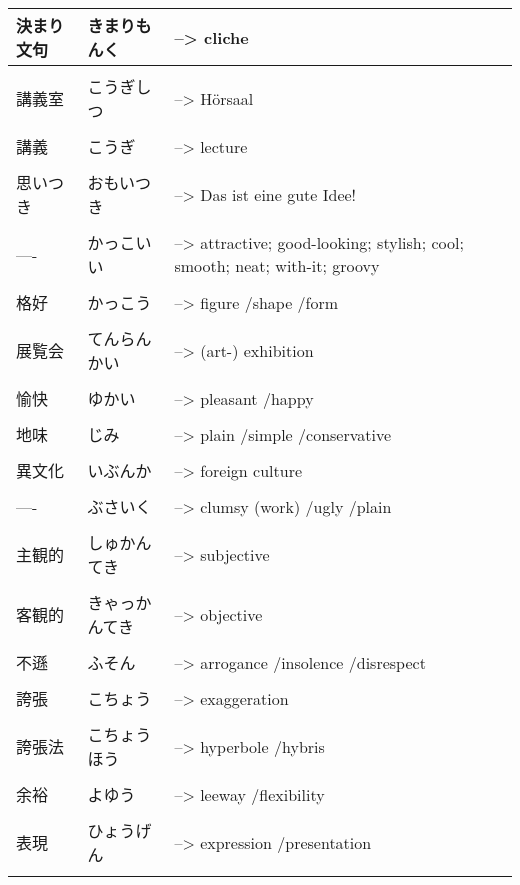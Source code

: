 \documentclass{article}
\begin{document}
\begin{tabular}{ l | l p{14cm}  }
決まり文句 & きまりもんく &--> cliche \\ \hline\\[-1em]
講義室 & こうぎしつ &--> Hörsaal \\ \hline\\[-1em]
講義 & こうぎ &--> lecture \\ \hline\\[-1em]
思いつき & おもいつき &--> Das ist eine gute Idee! \\ \hline\\[-1em]
---- & かっこいい &--> attractive; good-looking; stylish; cool; smooth; neat; with-it; groovy \\ \hline\\[-1em]
格好 & かっこう &--> figure /shape /form \\ \hline\\[-1em]
展覧会 & てんらんかい &--> (art-) exhibition \\ \hline\\[-1em]
愉快 & ゆかい &--> pleasant /happy \\ \hline\\[-1em]
地味 & じみ &--> plain /simple /conservative \\ \hline\\[-1em]
異文化 & いぶんか &--> foreign culture \\ \hline\\[-1em]
---- & ぶさいく &--> clumsy (work) /ugly /plain \\ \hline\\[-1em]
主観的 & しゅかんてき &--> subjective \\ \hline\\[-1em]
客観的 & きゃっかんてき &--> objective \\ \hline\\[-1em]
不遜 & ふそん &--> arrogance /insolence /disrespect \\ \hline\\[-1em]
誇張 & こちょう &--> exaggeration \\ \hline\\[-1em]
誇張法 & こちょうほう &--> hyperbole /hybris \\ \hline\\[-1em]
余裕 & よゆう &--> leeway /flexibility \\ \hline\\[-1em]
表現 & ひょうげん &--> expression /presentation \\ \hline\\[-1em]

\end{tabular}
\end{document}
